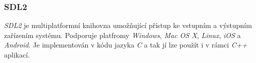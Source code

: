 \documentclass[11pt,twoside,a4paper]{book}
\begin{document}
\subsubsection{SDL2}
\textit{SDL2} je multiplatformní knihovna umožňující přístup ke vstupním a výstupním zařízením systému. Podporuje platfromy \textit{Windows}, \textit{Mac OS X}, \textit{Linux}, \textit{iOS} a \textit{Android}. Je implementován v kódu jazyka \textit{C} a tak jí lze použít i v rámci \textit{C++} aplikací.
\end{document}
